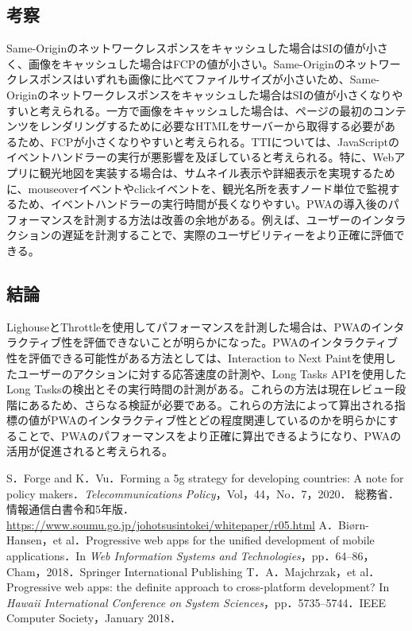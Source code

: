 \begin{multicols*}{2}
\subsection{考察}
Same-Originのネットワークレスポンスをキャッシュした場合はSIの値が小さく、画像をキャッシュした場合はFCPの値が小さい。Same-Originのネットワークレスポンスはいずれも画像に比べてファイルサイズが小さいため、Same-Originのネットワークレスポンスをキャッシュした場合はSIの値が小さくなりやすいと考えられる。一方で画像をキャッシュした場合は、ページの最初のコンテンツをレンダリングするために必要なHTMLをサーバーから取得する必要があるため、FCPが小さくなりやすいと考えられる。TTIについては、JavaScriptのイベントハンドラーの実行が悪影響を及ぼしていると考えられる。特に、Webアプリに観光地図を実装する場合は、サムネイル表示や詳細表示を実現するために、mouseoverイベントやclickイベントを、観光名所を表すノード単位で監視するため、イベントハンドラーの実行時間が長くなりやすい。PWAの導入後のパフォーマンスを計測する方法は改善の余地がある。例えば、ユーザーのインタラクションの遅延を計測することで、実際のユーザビリティーをより正確に評価できる。

\subsection{結論}
LighouseとThrottleを使用してパフォーマンスを計測した場合は、PWAのインタラクティブ性を評価できないことが明らかになった。PWAのインタラクティブ性を評価できる可能性がある方法としては、Interaction to Next Paintを使用したユーザーのアクションに対する応答速度の計測や、Long Tasks APIを使用したLong Tasksの検出とその実行時間の計測がある。これらの方法は現在レビュー段階にあるため、さらなる検証が必要である。これらの方法によって算出される指標の値がPWAのインタラクティブ性とどの程度関連しているのかを明らかにすることで、PWAのパフォーマンスをより正確に算出できるようになり、PWAの活用が促進されると考えられる。

\begin{thebibliography}{9}
 S．Forge and K．Vu．Forming a 5g strategy for developing countries: A note for policy makers．\textit{Telecommunications Policy}，Vol，44，No．7，2020．
 総務省．情報通信白書令和5年版．\url{https://www.soumu.go.jp/johotsusintokei/whitepaper/r05.html}
 A．Biørn-Hansen，et al．Progressive web apps for the unified development of mobile applications．In \textit{Web Information Systems and Technologies}，pp．64–86，Cham，2018．Springer International Publishing
 T．A．Majchrzak，et al．Progressive web apps: the definite approach to cross-platform development? In \textit{Hawaii International Conference on System Sciences}，pp．5735–5744．IEEE Computer Society，January 2018．
\end{thebibliography}
\end{multicols*} 


